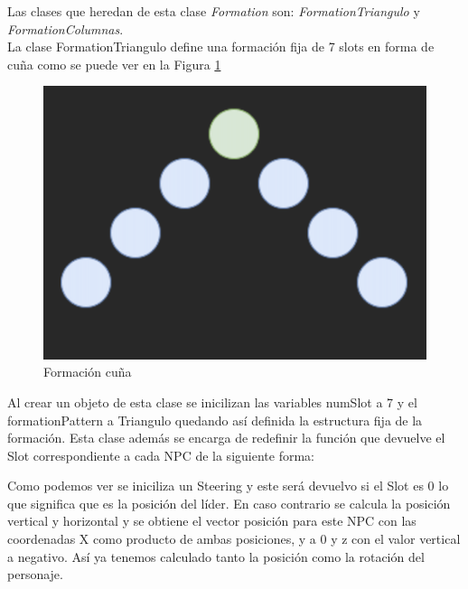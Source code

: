 Las clases que heredan de esta clase \textit{Formation} son: \textit{FormationTriangulo} y \textit{FormationColumnas}.\\
La clase FormationTriangulo define una formación fija de 7 slots en forma de cuña como se puede ver en la Figura \ref{fig:cuña}
\begin{figure}[H]
    \centering
    \includegraphics[scale=0.7]{formaciones/Screenshot 2022-04-01 at 19.03.11.png}
    \caption{Formación cuña}
    \label{fig:cuña}
\end{figure}
Al crear un objeto de esta clase se inicilizan las variables numSlot a 7 y el formationPattern a Triangulo quedando así definida la estructura fija de la formación. Esta clase además se encarga de redefinir la función que devuelve el Slot correspondiente a cada NPC de la siguiente forma:


Como podemos ver se iniciliza un Steering y este será devuelvo si el Slot es 0 lo que significa que es la posición del líder. En caso contrario se calcula la posición vertical y horizontal y se obtiene el vector posición para este NPC con las coordenadas X como producto de ambas posiciones, y a 0 y z con el valor vertical a negativo. Así ya tenemos calculado tanto la posición como la rotación del personaje.\\


